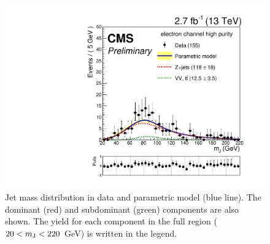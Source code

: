 \begin{figure}[p]
\begin{center}
\includegraphics[scale=0.35]{figures/fits/mjFitEHP.pdf}
\caption[Jet mass distribution]{Jet mass distribution in data and parametric model (blue line). The dominant (red) and subdominant (green) components are also shown. The yield for each component in the full region ($20 < m_\mathrm{J} < 220$ GeV) is written in the legend.}
\label{mjFit_VZ}
\end{center}
\end{figure}

